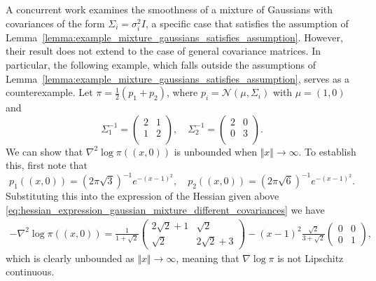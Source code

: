 \begin{remark}\label{remark:counter_example_mixture_gaussian}
A concurrent work \citep{gentilonisilveri2025logconcavityscoreregularityimproved} examines the smoothness of a mixture of Gaussians with covariances of the form $\Sigma_i=\sigma_i^2 I$, a specific case that satisfies the assumption of Lemma~\ref{lemma:example_mixture_gaussians_satisfies_assumption}. 
However, their result does not extend to the case of general covariance matrices. 
In particular, the following example, which falls outside the assumptions of Lemma~\ref{lemma:example_mixture_gaussians_satisfies_assumption}, serves as a counterexample. Let $\pi = \frac{1}{2}(p_1 + p_2)$, where $p_i=\mathcal{N}(\mu, \Sigma_i)$ with $\mu=(1,0)$ and 
\begin{equation*}
    \Sigma_1^{-1} = \begin{pmatrix}
        2 & 1\\
        1& 2\\
    \end{pmatrix}, \quad 
    \Sigma_2^{-1} = \begin{pmatrix}
        2 & 0\\
        0& 3\\
    \end{pmatrix}.
\end{equation*}
We can show that $\nabla^2\log\pi((x, 0))$ is unbounded when $\Vert x\Vert\to\infty$. To establish this, first note that 
\begin{equation*}
    p_1((x,0)) = (2\pi\sqrt{3})^{-1} e^{-(x-1)^2},\quad p_2((x,0)) = (2\pi\sqrt{6})^{-1} e^{-(x-1)^2}.
\end{equation*}
Substituting this into the expression of the Hessian given above \eqref{eq:hessian_expression_gaussian_mixture_different_covariances} we have
\begin{align*}
    -\nabla^2\log\pi((x,0)) = \frac{1}{1+\sqrt{2}}\begin{pmatrix}
        2\sqrt{2} +1&\sqrt{2}\\
        \sqrt{2}& 2\sqrt{2} +3
    \end{pmatrix}- (x-1)^2\frac{\sqrt{2}}{3 + \sqrt{2}}\begin{pmatrix}
        0&0\\
        0& 1
    \end{pmatrix},
\end{align*}
which is clearly unbounded as $\Vert x\Vert\to\infty$, meaning that $\nabla\log\pi$ is not Lipschitz continuous.
\end{remark}
